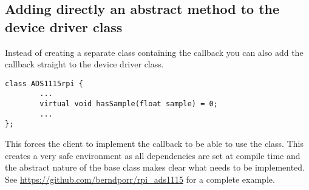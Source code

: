 \documentclass[12pt]{report}
\begin{document}
\subsection{Adding directly an abstract method to the device driver class}
Instead of creating a separate class containing the callback you
can also add the callback straight to the device driver class.
\begin{verbatim}
class ADS1115rpi {
        ...
        virtual void hasSample(float sample) = 0;
        ...
};
\end{verbatim}
This forces the client to implement the callback to be able to use
the class. This creates a very safe environment as all dependencies
are set at compile time and the abstract nature of the base class
makes clear what needs to be implemented.
See
\url{https://github.com/berndporr/rpi_ads1115} for a complete example.
\end{document}
